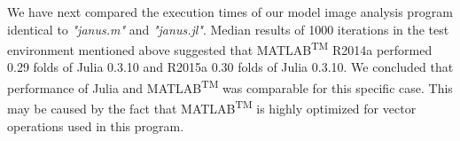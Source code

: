 We have next compared the execution times of our model image analysis program identical to \textit{"janus.m"} and \textit{"janus.jl"}. Median results of 1000 iterations in the test environment mentioned above suggested that MATLAB\textsuperscript{TM} R2014a performed 0.29 folds of Julia 0.3.10 and R2015a 0.30 folds of Julia 0.3.10. We concluded that performance of Julia and MATLAB\textsuperscript{TM} was comparable for this specific case. This may be caused by the fact that MATLAB\textsuperscript{TM} is highly optimized for vector operations used in this program.
